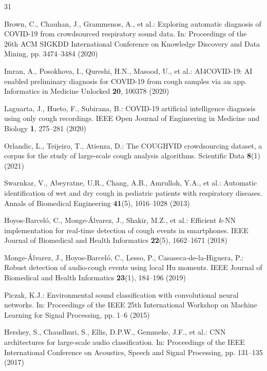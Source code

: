 \documentclass[pdflatex,sn-mathphys-num]{sn-jnl}
\begin{document}
\backmatter

\begin{thebibliography}{31}

Brown, C., Chauhan, J., Grammenos, A., et al.: Exploring automatic diagnosis
of COVID-19 from crowdsourced respiratory sound data. In: Proceedings of the
26th ACM SIGKDD International Conference on Knowledge Discovery and Data
Mining, pp. 3474--3484 (2020)

Imran, A., Posokhova, I., Qureshi, H.N., Masood, U., et al.: AI4COVID-19: AI
enabled preliminary diagnosis for COVID-19 from cough samples via an app.
Informatics in Medicine Unlocked \textbf{20}, 100378 (2020)

Laguarta, J., Hueto, F., Subirana, B.: COVID-19 artificial intelligence
diagnosis using only cough recordings. IEEE Open Journal of Engineering in
Medicine and Biology \textbf{1}, 275--281 (2020)

Orlandic, L., Teijeiro, T., Atienza, D.: The COUGHVID crowdsourcing dataset, a
corpus for the study of large-scale cough analysis algorithms. Scientific Data
\textbf{8}(1) (2021)

Swarnkar, V., Abeyratne, U.R., Chang, A.B., Amrulloh, Y.A., et al.: Automatic
identification of wet and dry cough in pediatric patients with respiratory
diseases. Annals of Biomedical Engineering \textbf{41}(5), 1016--1028 (2013)

Hoyos-Barcel\'o, C., Monge-\'Alvarez, J., Shakir, M.Z., et al.: Efficient
$k$-NN implementation for real-time detection of cough events in smartphones.
IEEE Journal of Biomedical and Health Informatics \textbf{22}(5), 1662--1671
(2018)

Monge-\'Alvarez, J., Hoyos-Barcel\'o, C., Lesso, P., Casaseca-de-la-Higuera,
P.: Robust detection of audio-cough events using local Hu moments. IEEE
Journal of Biomedical and Health Informatics \textbf{23}(1), 184--196 (2019)

Piczak, K.J.: Environmental sound classification with convolutional neural
networks. In: Proceedings of the IEEE 25th International Workshop on Machine
Learning for Signal Processing, pp. 1--6 (2015)

Hershey, S., Chaudhuri, S., Ellis, D.P.W., Gemmeke, J.F., et al.: CNN
architectures for large-scale audio classification. In: Proceedings of the
IEEE International Conference on Acoustics, Speech and Signal Processing,
pp. 131--135 (2017)


\end{thebibliography}
\end{document}
